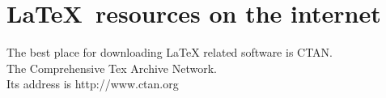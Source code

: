 \documentclass{article}
\begin{document}
%
\section{\sffamily\LaTeX\ resources on the internet}
%
The best place for downloading LaTeX related software is CTAN.\\
The Comprehensive Tex Archive Network.\\
Its address is \ttfamily http://www.ctan.org \rmfamily
\end{document}

